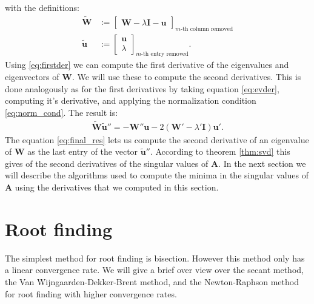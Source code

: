 \documentclass[a4paper, oneside]{thirdparty_stylesheets/discothesis}
\begin{document}
with the definitions:
\begin{align}
	\mathbf{\tilde{W}} &:= 
	\begin{bmatrix}
		\mathbf{W}-\lambda\mathbf{I}  -\mathbf{u}
	\end{bmatrix}
	_{\text{$m$-th column removed}} \\
	\mathbf{\tilde{u}} &:=  
	\begin{bmatrix}
		\mathbf{u} \\
		\lambda
	\end{bmatrix} 
	_{\text{$m$-th entry removed}}.
\end{align}
Using \ref{eq:firstder} we can compute the first derivative of the eigenvalues and eigenvectors of $\mathbf{W}$.
We will use these to compute the second derivatives.
This is done analogously as for the first derivatives by taking equation \ref{eq:evder}, computing it's derivative, and applying the normalization condition \ref{eq:norm_cond}.
The result is:
\begin{align}
	\mathbf{\tilde{W}} \mathbf{\tilde{u}}'' 
	= -\mathbf{W}''\mathbf{u} - 2(\mathbf{W}'-\lambda'\mathbf{I})\mathbf{u}'. \label{eq:final_res}
\end{align}
The equation \ref{eq:final_res} lets us compute the second derivative of an eigenvalue of $\mathbf{W}$ as the last entry of the vector $\mathbf{\tilde{u}}''$.
According to theorem \ref{thm:svd} this gives of the second derivatives of the singular values of $\mathbf{A}$.
In the next section we will describe the algorithms used to compute the minima in the singular values of $\mathbf{A}$ using the derivatives that we computed in this section.

\section{Root finding} \label{sec:roots}
The simplest method for root finding is bisection. 
However this method only has a linear convergence rate.
We will give a brief over view over the secant method, the Van Wijngaarden-Dekker-Brent method, and the Newton-Raphson method for root finding with higher convergence rates.
\end{document}
